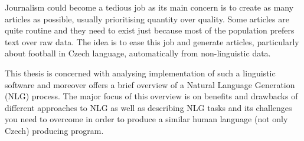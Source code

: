 \documentclass[12pt]{report}
\begin{document}

Journalism could become a tedious job as its main concern is to create as many
articles as possible, usually prioritising quantity over quality. Some articles are quite
routine and they need to exist just because most of the population prefers text over raw
data. The idea is to ease this job and generate articles, particularly about football in
Czech language, automatically from non-linguistic data.

This thesis is concerned with analysing implementation of such a linguistic software
and moreover offers a brief overview of a Natural Language Generation (NLG) process.
The major focus of this overview is on benefits and drawbacks of different approaches to
NLG as well as describing NLG tasks and its challenges you need to overcome in order
to produce a similar human language (not only Czech) producing program.
\end{document}

